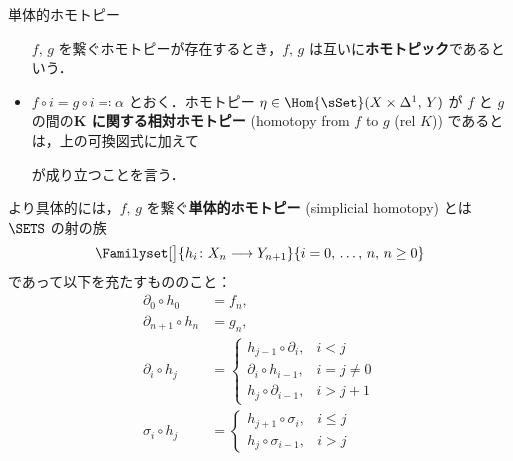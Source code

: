 \documentclass[TQFT_main]{subfiles}
\begin{document}
\begin{mydef}[label=def:SimpSet-homotopic,breakable]{単体的ホモトピー}
\begin{itemize}
\begin{center}
        \end{center}
        $f,\, g$ を繋ぐホモトピーが存在するとき，$f,\, g$ は互いに\textbf{ホモトピック}であるという．
        \item $f \circ i = g \circ i \eqqcolon \alpha$ とおく．ホモトピー $\eta \in \Hom{\sSet} (X \times \Delta^1,\, Y)$ が $f$ と $g$ の間の\textbf{$\bm{K}$ に関する相対ホモトピー} (homotopy from $f$ to $g$ (rel $K$)) であるとは，上の可換図式に加えて
        \begin{center}
        \end{center}
        が成り立つことを言う．
    \end{itemize}
    
    \tcblower

    より具体的には，$f,\, g$ を繋ぐ\textbf{単体的ホモトピー} (simplicial homotopy) とは $\SETS$ の射の族
    \begin{align}
        \Familyset[\big]{h_i \colon X_n \lto Y_{n+1}}{i = 0,\, \dots,\, n,\, n \ge 0}
    \end{align}
    であって以下を充たすもののこと：
    \begin{align}
        \partial_0 \circ h_0 &= f_n, \\
        \partial_{n+1} \circ h_n &= g_n, \\
        \partial_i \circ h_j &=
        \begin{cases}
            h_{j-1} \circ \partial_{i}, &i < j \\
            \partial_i \circ h_{i-1}, &i=j \neq 0 \\
            h_j \circ \partial_{i-1}, &i > j+1
        \end{cases} \\
        \sigma_i \circ h_j &=
        \begin{cases}
            h_{j+1} \circ \sigma_i, &i \le j \\
            h_j \circ \sigma_{i-1}, &i > j
        \end{cases}
    \end{align}
\end{mydef}
\end{document}
